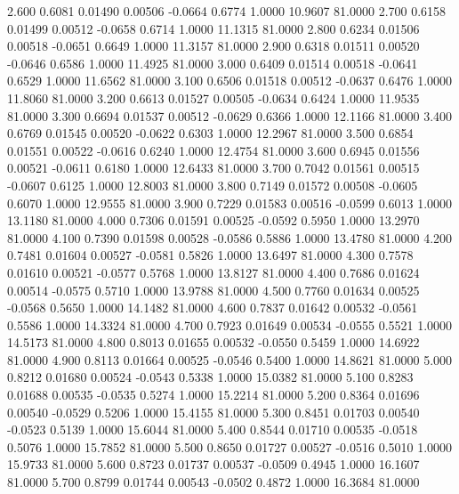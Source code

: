    2.600   0.6081   0.01490   0.00506  -0.0664   0.6774   1.0000  10.9607  81.0000
   2.700   0.6158   0.01499   0.00512  -0.0658   0.6714   1.0000  11.1315  81.0000
   2.800   0.6234   0.01506   0.00518  -0.0651   0.6649   1.0000  11.3157  81.0000
   2.900   0.6318   0.01511   0.00520  -0.0646   0.6586   1.0000  11.4925  81.0000
   3.000   0.6409   0.01514   0.00518  -0.0641   0.6529   1.0000  11.6562  81.0000
   3.100   0.6506   0.01518   0.00512  -0.0637   0.6476   1.0000  11.8060  81.0000
   3.200   0.6613   0.01527   0.00505  -0.0634   0.6424   1.0000  11.9535  81.0000
   3.300   0.6694   0.01537   0.00512  -0.0629   0.6366   1.0000  12.1166  81.0000
   3.400   0.6769   0.01545   0.00520  -0.0622   0.6303   1.0000  12.2967  81.0000
   3.500   0.6854   0.01551   0.00522  -0.0616   0.6240   1.0000  12.4754  81.0000
   3.600   0.6945   0.01556   0.00521  -0.0611   0.6180   1.0000  12.6433  81.0000
   3.700   0.7042   0.01561   0.00515  -0.0607   0.6125   1.0000  12.8003  81.0000
   3.800   0.7149   0.01572   0.00508  -0.0605   0.6070   1.0000  12.9555  81.0000
   3.900   0.7229   0.01583   0.00516  -0.0599   0.6013   1.0000  13.1180  81.0000
   4.000   0.7306   0.01591   0.00525  -0.0592   0.5950   1.0000  13.2970  81.0000
   4.100   0.7390   0.01598   0.00528  -0.0586   0.5886   1.0000  13.4780  81.0000
   4.200   0.7481   0.01604   0.00527  -0.0581   0.5826   1.0000  13.6497  81.0000
   4.300   0.7578   0.01610   0.00521  -0.0577   0.5768   1.0000  13.8127  81.0000
   4.400   0.7686   0.01624   0.00514  -0.0575   0.5710   1.0000  13.9788  81.0000
   4.500   0.7760   0.01634   0.00525  -0.0568   0.5650   1.0000  14.1482  81.0000
   4.600   0.7837   0.01642   0.00532  -0.0561   0.5586   1.0000  14.3324  81.0000
   4.700   0.7923   0.01649   0.00534  -0.0555   0.5521   1.0000  14.5173  81.0000
   4.800   0.8013   0.01655   0.00532  -0.0550   0.5459   1.0000  14.6922  81.0000
   4.900   0.8113   0.01664   0.00525  -0.0546   0.5400   1.0000  14.8621  81.0000
   5.000   0.8212   0.01680   0.00524  -0.0543   0.5338   1.0000  15.0382  81.0000
   5.100   0.8283   0.01688   0.00535  -0.0535   0.5274   1.0000  15.2214  81.0000
   5.200   0.8364   0.01696   0.00540  -0.0529   0.5206   1.0000  15.4155  81.0000
   5.300   0.8451   0.01703   0.00540  -0.0523   0.5139   1.0000  15.6044  81.0000
   5.400   0.8544   0.01710   0.00535  -0.0518   0.5076   1.0000  15.7852  81.0000
   5.500   0.8650   0.01727   0.00527  -0.0516   0.5010   1.0000  15.9733  81.0000
   5.600   0.8723   0.01737   0.00537  -0.0509   0.4945   1.0000  16.1607  81.0000
   5.700   0.8799   0.01744   0.00543  -0.0502   0.4872   1.0000  16.3684  81.0000
